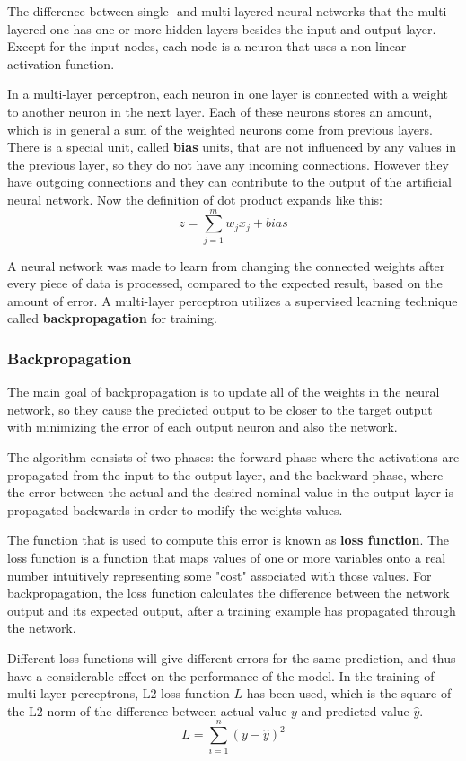 The difference between single- and multi-layered neural networks that the multi-layered one has one or more hidden layers besides the input and output layer. Except for the input nodes, each node is a neuron that uses a non-linear activation function. \medskip

In a multi-layer perceptron, each neuron in one layer is connected with a weight to another neuron in the next layer. Each of these neurons stores an amount, which is in general a sum of the weighted neurons come from previous layers. There is a special unit, called \textbf{bias} units, that are not influenced by any values in the previous layer, so they do not have any incoming connections. However they have outgoing connections and they can contribute to the output of the artificial neural network. Now the definition of dot product expands like this:
$$ z = \sum_{j=1}^m w_j x_j + bias $$

A neural network was made to learn from changing the connected weights after every piece of data is processed, compared to the expected result, based on the amount of error. A multi-layer perceptron utilizes a supervised learning technique called \textbf{backpropagation} for training.


\subsubsection{Backpropagation}

The main goal of backpropagation is to update all of the weights in the neural network, so they cause the predicted output to be closer to the target output with minimizing the error of each output neuron and also the network.

The algorithm consists of two phases: the forward phase where the activations are propagated from the input to the output layer, and the backward phase, where the error between the actual and the desired nominal value in the output layer is propagated backwards in order to modify the weights values. \medskip

The function that is used to compute this error is known as \textbf{loss function}. The loss function is a function that maps values of one or more variables onto a real number intuitively representing some "cost" associated with those values. For backpropagation, the loss function calculates the difference between the network output and its expected output, after a training example has propagated through the network. \medskip

Different loss functions will give different errors for the same prediction, and thus have a considerable effect on the performance of the model. In the training of multi-layer perceptrons, L2 loss function $L$ has been used, which is the square of the L2 norm of the difference between actual value $y$ and predicted value $\hat{y}$.
$$ L = \sum^n_{i=1}(y - \hat{y})^2 $$




